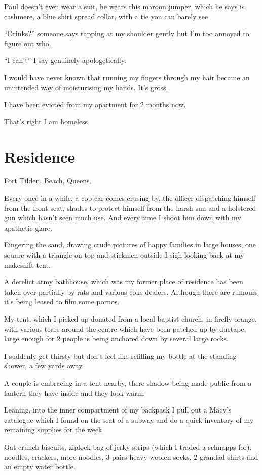 \documentclass[19pt,openany]{book}
\begin{document}
Paul doesn't even wear a suit, he wears this
maroon jumper, which he says
is cashmere,
a blue shirt spread collar, with a tie you can barely see

``Drinks?'' someone says tapping at my shoulder
gently but I'm too annoyed to figure out who.

``I can't'' I say genuinely apologetically.

I would have never known that running my fingers through
my hair became an unintended way of moisturising my hands. It's gross.

I have been evicted from my apartment for 2 months now.

That's right I am homeless.

\chapter*{Residence}
Fort Tilden, Beach, Queens.

Every once in a while, a cop
car comes crusing by, the officer
dispatching himself from the front
seat, shades to protect himself
from the harsh sun
and a holstered gun
which hasn't seen much
use. And every time
I shoot him down with
my apathetic
glare.

Fingering the sand, drawing
crude pictures of happy
families in large houses, one square
with a triangle on top and stickmen
outside I sigh looking back
at my makeshift tent.

A derelict army bathhouse,
which was my former place of
residence has been taken
over partially by rats
and various coke dealers.
Although there are rumours
it's being leased to film
some pornos.

My tent, which I picked
up donated from a local
baptist church, in
firefly orange, with
various tears around
the centre which
have been patched
up by ductape, large enough
for 2 people  is being
anchored down by several large rocks.

I suddenly get thirsty but don't
feel like refilling my bottle
at the standing shower, a few
yards away.

A couple is embracing in a tent
nearby, there shadow being made
public from a lantern they have
inside and they look warm.

Leaning, into the inner
compartment of my backpack I
pull out a Macy's catalogue
which I found on the seat of
a subway and do a quick
inventory of my remaining
supplies for the week.

Oat crunch biscuits,
ziplock bag of jerky
strips (which I traded
a schnapps for), noodles,
crackers, more noodles,
3 pairs
heavy woolen socks, 2 grandad
shirts and an empty water bottle.
\end{document}
